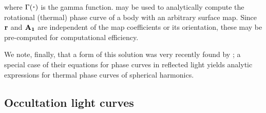 \documentclass[modern]{aastex61}
\begin{document}
%
where $\Gamma(\bigdot)$ is the gamma function.
%
 may be used to analytically compute the rotational (thermal) phase curve of a body
with an arbitrary surface map. Since ${\mathbf{r}}$ and ${\mathbf{A_1}}$ are independent
of the map coefficients or its orientation, these may be pre-computed for
computational efficiency.

We note, finally, that a form of this solution was very recently found by \citet{Haggard2018};
a special case of their equations for phase curves in reflected light yields
analytic expressions for thermal phase curves of spherical harmonics.

\subsection{Occultation light curves}
\label{sec:occultationflux}
\end{document}

